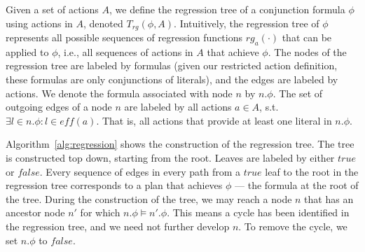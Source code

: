 \documentclass[letterpaper]{article}
\newcommand{\eff}{\textit{eff}}
\theoremstyle{definition}
\begin{document}
Given a set of actions $A$, we define the regression tree of a conjunction formula $\phi$ using actions in $A$, denoted $T_{rg}(\phi, A)$.
Intuitively, the regression tree of $\phi$ represents all possible
sequences of regression functions $rg_a(\cdot)$ that can be applied to $\phi$, i.e., all sequences of actions in $A$ that achieve $\phi$.
The nodes of the regression tree are labeled by formulas (given our restricted action definition, these formulas are only conjunctions of literals), and the edges are labeled by actions. We denote the formula associated with node $n$ by $n.\phi$. The set of outgoing edges of a node $n$ are labeled by all actions $a \in A$, s.t. $\exists l \in n.\phi : l \in \eff(a)$. That is, all actions that provide at least one literal in $n.\phi$.

Algorithm~\ref{alg:regression} shows the construction of the regression tree. The tree is constructed top down, starting from the root. Leaves are labeled by either $true$ or $false$. Every sequence of edges in every path from a $true$ leaf to the root in the regression tree corresponds to a plan that achieves $\phi$ --- the formula at the root of the tree. During the construction of the tree,
we may reach a node $n$
that has an ancestor node $n'$ for which $n.\phi \models n'.\phi$.
This means a cycle has been identified in the regression tree, and we need not further develop $n$. To remove the cycle, we set $n.\phi$ to $false$.
\end{document}
